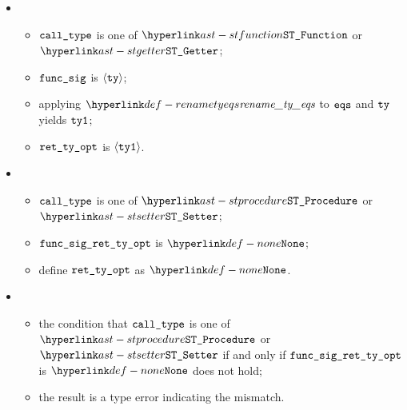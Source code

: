 \ProseParagraph
\OneApplies
\begin{itemize}
  \item {}
  \begin{itemize}
    \item $\calltype$ is one of $\STFunction$ or $\STGetter$;
    \item $\funcsig$ is $\langle\tty\rangle$;
    \item applying $\renametyeqs$ to $\eqs$ and $\tty$ yields $\ttyone$\ProseOrTypeError;
    \item $\rettyopt$ is $\langle\ttyone\rangle$.
  \end{itemize}

  \item {}
  \begin{itemize}
    \item $\calltype$ is one of $\STProcedure$ or $\STSetter$;
    \item $\funcsigrettyopt$ is $\None$;
    \item define $\rettyopt$ as $\None$.
  \end{itemize}

  \item {}
  \begin{itemize}
    \item the condition that $\calltype$ is one of $\STProcedure$ or $\STSetter$
          if and only if $\funcsigrettyopt$ is $\None$ does not hold;
    \item the result is a type error indicating the mismatch.
  \end{itemize}
\end{itemize}

\FormallyParagraph
\begin{mathpar}
\end{mathpar}

\begin{mathpar}
\end{mathpar}


